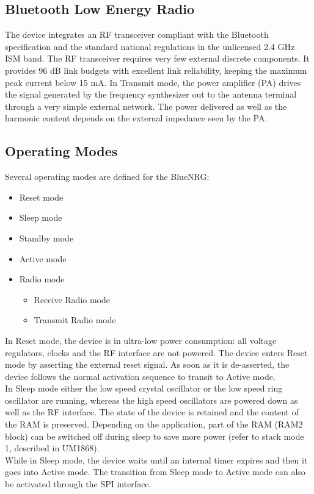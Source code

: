 \subsection{Bluetooth Low Energy Radio}
The device integrates an RF transceiver compliant with the Bluetooth specification and the standard national regulations in the unlicensed 2.4 GHz ISM band. The RF transceiver requires very few external discrete components. It provides 96 dB link budgets with excellent link reliability, keeping the maximum peak current below 15 mA. In Transmit mode, the power amplifier (PA) drives the signal generated by the frequency synthesizer out to the antenna terminal through a very simple external network. The power delivered as well as the harmonic content depends on the external impedance seen by the PA.
\subsection{Operating Modes}
Several operating modes are defined for the BlueNRG:
\begin{itemize}
	\item Reset mode
	\item Sleep mode 
	\item Standby mode 
	\item Active mode 
	\item Radio mode 
	\begin{itemize}
		\item Receive Radio mode 
		\item Transmit Radio mode
	\end{itemize}
\end{itemize}
In Reset mode, the device is in ultra-low power consumption: all voltage regulators, clocks and the RF interface are not powered. The device enters Reset mode by asserting the external reset signal. As soon as it is de-asserted, the device follows the normal activation sequence to transit to Active mode. \\
In Sleep mode either the low speed crystal oscillator or the low speed ring oscillator are running, whereas the high speed oscillators are powered down as well as the RF interface. The state of the device is retained and the content of the RAM is preserved. Depending on the application, part of the RAM (RAM2 block) can be switched off during sleep to save more power (refer to stack mode 1, described in UM1868). \\
While in Sleep mode, the device waits until an internal timer expires and then it goes into Active mode. The transition from Sleep mode to Active mode can also be activated through the SPI interface. \\
